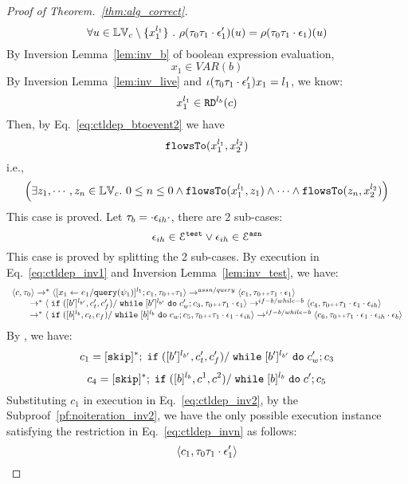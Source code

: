 \begin{proof}[Proof of Theorem.~\ref{thm:alg_correct}]
\[
  \forall u \in \mathbb{LV}_c \setminus \{x_1^{l_1}\} ~.~
  \rho(\mathtt{\tau}_0 \mathtt{\tau}_1 \cdot \mathtt{\epsilon}_1') (u) =  
  \rho(\mathtt{\tau}_0 \mathtt{\tau}_1 \cdot \mathtt{\epsilon}_1) (u)
\]
%
By {Inversion Lemma~\ref{lem:inv_b}} of boolean expression evaluation,
 \[
  x_1 \in VAR(b)
 \]
 By Inversion Lemma~\ref{lem:inv_live} and $\iota(\mathtt{\tau}_0 \mathtt{\tau}_1 \cdot \mathtt{\epsilon}_1') x_1 = l_1$, we know:
\[
  x_1^{l_1} \in \mathtt{RD}^{l_b}(c)
\]
 Then, by Eq.~\ref{eq:ctldep_btoevent2} we have
 \[
 \mathtt{flowsTo}(x_1^{l_1}, x_2^{l_2})
 \]
 i.e.,
 \[
 \Big( \exists z_1, \cdots, z_n \in \mathbb{LV}_{{c}}. ~ 0 \leq n \leq 0 \land
  \mathtt{flowsTo}(x_1^{l_1}, z_1) 
  \land \cdots \land \mathtt{flowsTo}(z_n, x_2^{l_2}) \Big)
 \]
 This case is proved.
%
 Let $\mathtt{\tau}_b = \cdot \mathtt{\epsilon}_{ih} \cdot$, there are 2 sub-cases: 
 \[
 \mathtt{\epsilon}_{ih} \in \mathcal{E}^{\mathtt{{test}}} \lor \mathtt{\epsilon}_{ih} \in \mathcal{E}^{\mathtt{{asn}}}
 \]
 This case is proved by splitting the 2 sub-cases.
By execution in Eq.~\ref{eq:ctldep_inv1} and {Inversion Lemma~\ref{lem:inv_test}}, we have:
%
\[
  \begin{array}{l}   
  \langle {c}, \mathtt{\tau}_0 \rangle 
  \rightarrow^{*} 
  \langle [\mathrel{ {x}_1 \leftarrow e_1 / {\tt query}(\psi_1) }]^{l_1} ; {c}_1, \mathtt{\tau}_0 {\scriptscriptstyle ++} \mathtt{\tau}_1 \rangle  
  \rightarrow^{assn/query}
  \langle c_1, \mathtt{\tau}_0 {\scriptscriptstyle ++} \mathtt{\tau}_1 \cdot \mathtt{\epsilon}_1 \rangle 
  \\ 
  \qquad \rightarrow^{*} 
  \langle \;\mathtt{if}\;([b']{}^{l_{b'}}, c_t', c_f') / \;\mathtt{while}\; [b']{}^{l_{b'}} \;\mathtt{do}\; c_w'; {c}_3, 
  \mathtt{\tau}_0 {\scriptscriptstyle ++} \mathtt{\tau}_1 \cdot \mathtt{\epsilon}_1 \rangle 
  \rightarrow^{if-b / while-b} 
  \langle {c}_4,  \mathtt{\tau}_0 {\scriptscriptstyle ++} \mathtt{\tau}_1 \cdot \mathtt{\epsilon}_1 \cdot \mathtt{\epsilon}_{ih} \rangle 
  \\ 
  \qquad \rightarrow^{*} 
  \langle \;\mathtt{if}\;([b]{}^{l_b}, c_t, c_f) / \;\mathtt{while}\; [b]{}^{l_b} \;\mathtt{do}\; c_w; {c}_5, 
  \mathtt{\tau}_0 {\scriptscriptstyle ++} \mathtt{\tau}_1 \cdot \mathtt{\epsilon}_1\cdot \mathtt{\epsilon}_{ih} \rangle 
  \rightarrow^{if-b / while-b} 
  \langle {c}_6,  \mathtt{\tau}_0 {\scriptscriptstyle ++} \mathtt{\tau}_1 \cdot \mathtt{\epsilon}_1 \cdot \mathtt{\epsilon}_{ih} \cdot \mathtt{\epsilon}_b \rangle 
\end{array}
 \]
 By , we have:
 \[
 c_1 = [\mathtt{skip}]^*;\;\mathtt{if}\;([b']{}^{l_{b'}}, c_t', c_f') / \;\mathtt{while}\; [b']{}^{l_{b'}} \;\mathtt{do}\; c_w'; {c}_3
 \]
 \[
 c_4 = [\mathtt{skip}]^*;\;\mathtt{if}\;([b]{}^{l_b}, c^1, c^2) / \;\mathtt{while}\; [b]{}^{l_b} \;\mathtt{do}\; c'; {c}_5
 \]
Substituting $c_1$ in execution in Eq.~\ref{eq:ctldep_inv2}, by the Subproof~\ref{pf:noiteration_inv2}, 
we have the only possible execution instance satisfying 
the restriction in Eq.~\ref{eq:ctldep_invn} as follows:
%
 \[
  \langle c_1, \mathtt{\tau}_0 \mathtt{\tau}_1 \cdot \mathtt{\epsilon}_1' \rangle 
\]
\end{proof}
